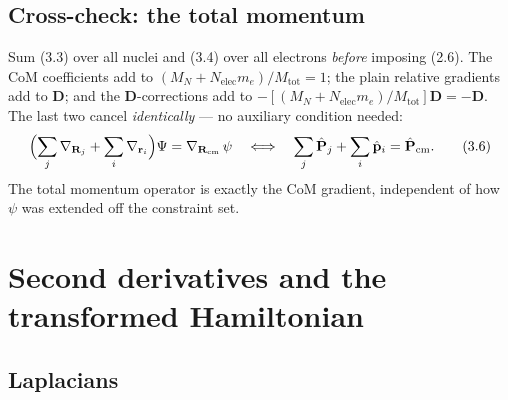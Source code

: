 \documentclass{article}
\begin{document}
\subsection{Cross-check: the total momentum}

Sum (3.3) over all nuclei and (3.4) over all electrons \emph{before} imposing (2.6). The CoM coefficients add to $(M_N+N_{\mathrm{elec}}m_e)/M_{\mathrm{tot}}=1$; the plain relative gradients add to $\mathbf{D}$; and the $\mathbf{D}$-corrections add to $-[(M_N+N_{\mathrm{elec}}m_e)/M_{\mathrm{tot}}]\mathbf{D}=-\mathbf{D}$. The last two cancel \emph{identically} --- no auxiliary condition needed:
\begin{equation}
\Bigl(\sum_j\nabla_{\mathbf{R}_j}+\sum_i\nabla_{\mathbf{r}_i}\Bigr)\Psi=\nabla_{\mathbf{R}_{\mathrm{cm}}}\,\psi
\quad\Longleftrightarrow\quad
\sum_j\hat{\mathbf{P}}_j+\sum_i\hat{\mathbf{p}}_i=\hat{\mathbf{P}}_{\mathrm{cm}}. \tag{3.6}
\end{equation}
The total momentum operator is exactly the CoM gradient, independent of how $\psi$ was extended off the constraint set.

\section{Second derivatives and the transformed Hamiltonian}

\subsection{Laplacians}
\end{document}
